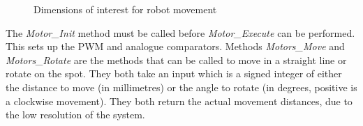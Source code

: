 \begin{figure}
\centering
{}
\caption{Dimensions of interest for robot movement}
\label{fig:RobotBase_Annotated}
\end{figure}

 

The \textit{Motor\_Init} method must be called before \textit{Motor\_Execute} can be performed. This sets up the PWM and analogue comparators. Methods \textit{Motors\_Move} and \textit{Motors\_Rotate} are the methods that can be called to move in a straight line or rotate on the spot. They both take an input which is a signed integer of either the distance to move (in millimetres) or the angle to rotate (in degrees, positive is a clockwise movement). They both return the actual movement distances, due to the low resolution of the system.


